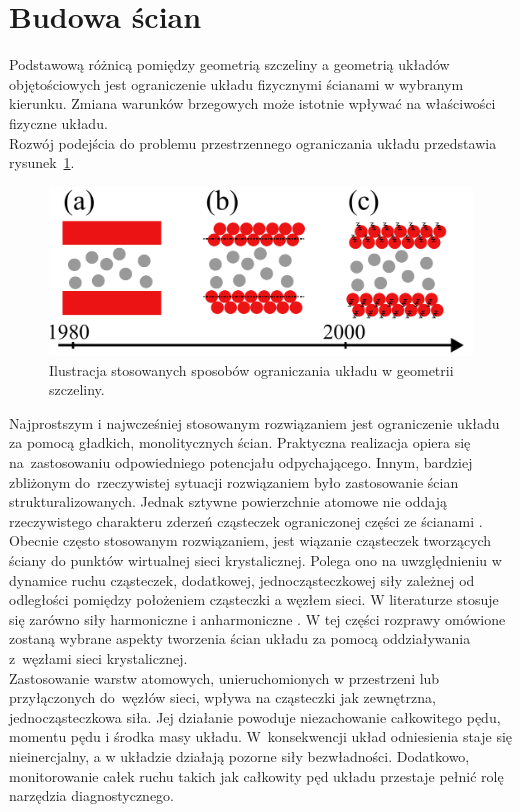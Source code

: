 \documentclass[12pt,a4paper,openright]{report} %
\begin{document}
\section{Budowa ścian}
\label{conf}
Podstawową różnicą pomiędzy geometrią szczeliny a geometrią układów objętościowych jest ograniczenie układu fizycznymi ścianami w wybranym kierunku. Zmiana warunków brzegowych może istotnie wpływać na właściwości fizyczne układu. \\Rozwój podejścia do problemu przestrzennego ograniczania układu przedstawia \linebreak rysunek~\ref{ewolO}.
%
\begin{figure}[h!]
\centering
\includegraphics[width=12cm, clip]{rysunki/ewolucjaOGR.pdf}
\caption{Ilustracja stosowanych sposobów ograniczania układu w geometrii szczeliny.}
\label{ewolO}
\end{figure}
%
Najprostszym i najwcześniej stosowanym rozwiązaniem jest ograniczenie układu za pomocą gładkich, monolitycznych ścian. Praktyczna realizacja opiera się na~zastosowaniu odpowiedniego potencjału odpychającego. Innym, bardziej zbliżonym do~rzeczywistej sytuacji rozwiązaniem było zastosowanie ścian strukturalizowanych. Jednak sztywne powierzchnie atomowe nie oddają rzeczywistego charakteru zderzeń cząsteczek ograniczonej części ze ścianami \cite{Bernardi2010}. Obecnie często stosowanym rozwiązaniem, jest wiązanie cząsteczek tworzących ściany do punktów wirtualnej sieci krystalicznej. Polega ono na uwzględnieniu w dynamice ruchu cząsteczek, dodatkowej, jednocząsteczkowej siły zależnej od odległości pomiędzy położeniem cząsteczki a węzłem sieci. W literaturze stosuje się zarówno siły harmoniczne i anharmoniczne \cite{Todd, PetravicHarrowell2006, DMH1}. W tej części rozprawy omówione zostaną wybrane aspekty tworzenia ścian układu za pomocą oddziaływania z~węzłami sieci krystalicznej. \\
%
%
%
Zastosowanie warstw atomowych, unieruchomionych w przestrzeni lub przyłączonych do~węzłów sieci, wpływa na cząsteczki jak zewnętrzna, jednocząsteczkowa siła. Jej działanie powoduje niezachowanie całkowitego pędu, momentu pędu i środka masy układu. W~konsekwencji układ odniesienia staje się nieinercjalny, a w układzie działają pozorne siły bezwładności. Dodatkowo, monitorowanie całek ruchu takich jak całkowity pęd układu przestaje pełnić rolę narzędzia diagnostycznego. \\
\end{document}
